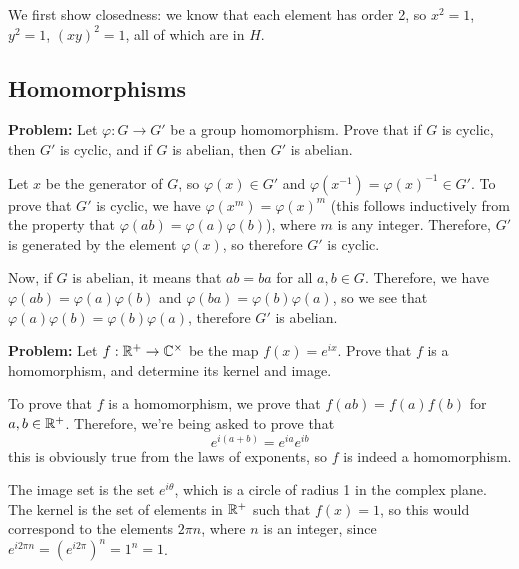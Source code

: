 \documentclass[10pt]{article}
\newenvironment{problem}{\textbf{Problem:}}{}
\begin{document}
\begin{solution}
	We first show closedness: we know that each element has order 2, so \( x^2 = 1 \), 
	\( y^2 = 1 \), \( (xy)^2 = 1 \), all of which are in \( H \).  

\end{solution}

\subsection{Homomorphisms}

\begin{problem}
	Let \( \varphi: G \to G' \) be a group homomorphism. 
	Prove that if \( G \) is cyclic, 
	then \( G' \) is cyclic, and if \( G \) is abelian, then \( G' \) is 
	abelian. 
\end{problem}

\begin{solution}
	Let \( x \) be the generator of \( G \), so \( \varphi(x) \in G' \) and 
	\( \varphi(x^{-1}) = \varphi(x)^{-1} \in G' \). To prove that 
	\( G' \) is cyclic, we have \( \varphi(x^{m}) = \varphi(x)^{m} \) (this 
	follows inductively from the property that 
	\( \varphi(ab) = \varphi(a) \varphi(b) \)), where \( m \) 
	is any integer. Therefore, \( G' \) is generated by the element \( \varphi(x) \), 
	so therefore \( G' \) is cyclic. 

	Now, if \( G \) is abelian, it means that \( ab = ba \) for all \( a, b \in G \). 
	Therefore, we have \( \varphi(ab) = \varphi(a) \varphi(b) \) and 
	\( \varphi(ba) = \varphi(b) \varphi(a) \), so we see that \( \varphi(a) \varphi(b)
	= \varphi(b) \varphi(a)\), therefore \( G' \) is abelian. 
\end{solution}

\begin{problem}
	Let \( f: \mathbb R^{+} \to \mathbb C^{\times} \) be the map \( f(x) = e^{ix} \). Prove that 
	\( f \) is a homomorphism, and determine its kernel and image. 
\end{problem}

\begin{solution}
	To prove that \( f \) is a homomorphism, we prove that \( f(ab) = f(a) f(b) \) 
	for \( a, b \in \mathbb R^{+} \). Therefore, we're being asked to prove that
	\[
	e^{i(a + b)} = e^{ia} e^{ib}
	\] 
	this is obviously true from the laws of exponents, so \( f \) is indeed a 
	homomorphism. 

	The image set is the set \( e^{i \theta} \), which is a circle of radius 1 in the 
	complex plane. The kernel is the set of elements in \( \mathbb R^{+} \) such that 
	\( f(x) = 1 \), so this would correspond to the elements \( 2\pi n \), where 
	\( n  \) is an integer, since \( e^{i2 \pi n} = (e^{i2\pi})^{n} = 1^{n} = 1 \). 
\end{solution}
\end{document}
